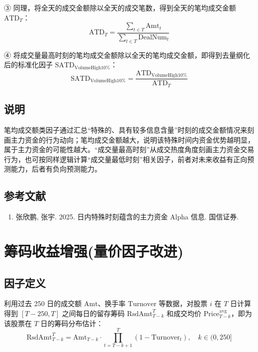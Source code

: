 \documentclass{article}
\begin{document}
③ 同理，将全天的成交金额除以全天的成交笔数，得到全天的笔均成交金额 \( \mathrm{ATD}_T \)：
\begin{equation}
    \mathrm{ATD}_T = \frac{\sum_{t \in T} \mathrm{Amt}_t}{\sum_{t \in T} \mathrm{DealNum}_t}
\end{equation}

④ 将成交量最高时刻的笔均成交金额除以全天的笔均成交金额，即得到去量纲化后的标准化因子 \( \mathrm{SATD}_{\mathrm{VolumeHigh10\%}} \)：
\begin{equation}
    \mathrm{SATD}_{\mathrm{VolumeHigh10\%}} = \frac{\mathrm{ATD}_{\mathrm{VolumeHigh10\%}}}{\mathrm{ATD}_T}
\end{equation}

\subsection{说明}
笔均成交额类因子通过汇总“特殊的、具有较多信息含量”时刻的成交金额情况来刻画主力资金的行为动向；笔均成交金额越大，说明该特殊时间内资金优势越明显，属于主力资金的可能性越大。“成交量最高时刻”从成交热度角度刻画主力资金交易行为，也可按同样逻辑计算“成交量最低时刻”相关因子，前者对未来收益有正向预测能力，后者有负向预测能力。

\subsection{参考文献}
\begin{enumerate}
    \item 张欣鹏, 张宇. 2025. 日内特殊时刻蕴含的主力资金 Alpha 信息. 国信证券.
\end{enumerate}

\section{筹码收益增强(量价因子改进)}

\subsection{因子定义}
利用过去 250 日的成交额 \( \mathrm{Amt} \)、换手率 \( \mathrm{Turnover} \) 等数据，对股票 \( i \) 在 \( T \) 日计算得到 \([T-250, T]\) 之间每日的留存筹码 \( \mathrm{RsdAmt}_{T-k}^T \) 和成交均价 \( \mathrm{Price}_{T-k}^{\mathrm{avg}} \)，即为该股票在 \( T \) 日的筹码分布估计：
\begin{equation}
    \mathrm{RsdAmt}_{T-k}^T = \mathrm{Amt}_{T-k} \cdot \prod_{t=T-k+1}^{T} (1 - \mathrm{Turnover}_t), \quad k \in (0, 250]
\end{equation}
\end{document}

